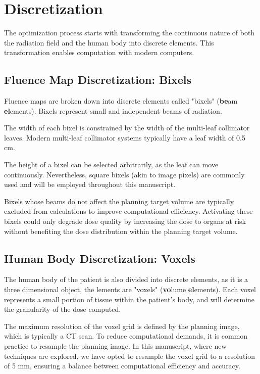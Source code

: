 \section{Discretization}
The optimization process starts with transforming the continuous nature of both the radiation field and the human body into discrete elements.
This transformation enables computation with modern computers.

\subsection[Bixels]{Fluence Map Discretization: Bixels}
Fluence maps are broken down into discrete elements called "bixels" (\textbf{be}am \textbf{el}ements).
Bixels represent small and independent beams of radiation.

The width of each bixel is constrained by the width of the multi-leaf collimator leaves.
Modern multi-leaf collimator systems typically have a leaf width of 0.5 cm.

The height of a bixel can be selected arbitrarily, as the leaf can move continuously.
Nevertheless, square bixels (akin to image pixels) are commonly used and will be employed throughout this manuscript.

Bixels whose beams do not affect the planning target volume are typically excluded from calculations to improve computational efficiency.
Activating these bixels could only degrade dose quality by increasing the dose to organs at risk without benefiting the dose distribution within the planning target volume.

\subsection[Voxels]{Human Body Discretization: Voxels}
The human body of the patient is also divided into discrete elements, as it is a three dimensional object, the lements are "voxels" (\textbf{vo}lume \textbf{el}ements).
Each voxel represents a small portion of tissue within the patient's body, and will determine the granularity of the dose computed.

The maximum resolution of the voxel grid is defined by the planning image, which is typically a CT scan.
To reduce computational demands, it is common practice to resample the planning image.
In this manuscript, where new techniques are explored, we have opted to resample the voxel grid to a resolution of 5 mm, ensuring a balance between computational efficiency and accuracy.

